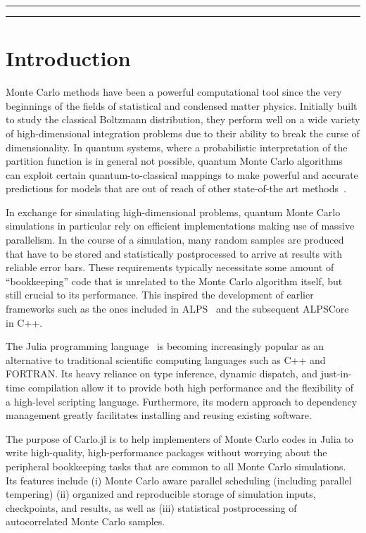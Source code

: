 \documentclass{SciPost}
\begin{document}
\vspace{10pt}
\noindent\rule{\textwidth}{1pt}
\tableofcontents
\noindent\rule{\textwidth}{1pt}
\vspace{10pt}

\section{Introduction}
\label{sec:intro}
Monte Carlo methods have been a powerful computational tool since the very beginnings of the fields of statistical and condensed matter physics\cite{Metropolis1953}. Initially built to study the classical Boltzmann distribution, they perform well on a wide variety of high-dimensional integration problems due to their ability to break the curse of dimensionality. In quantum systems, where a probabilistic interpretation of the partition function is in general not possible, quantum Monte Carlo algorithms can exploit certain quantum-to-classical mappings to make powerful and accurate predictions for models that are out of reach of other state-of-the art methods~\cite{Gubernatis2016}. 

In exchange for simulating high-dimensional problems, quantum Monte Carlo simulations in particular rely on efficient implementations making use of massive parallelism. In the course of a simulation, many random samples are produced that have to be stored and statistically postprocessed to arrive at results with reliable error bars. These requirements typically necessitate some amount of ``bookkeeping'' code that is unrelated to the Monte Carlo algorithm itself, but still crucial to its performance. This inspired the development of earlier frameworks such as the ones included in ALPS~\cite{ALPS} and the subsequent ALPSCore~\cite{ALPSCore} in C++.

The Julia programming language~\cite{Bezanson2012} is becoming increasingly popular as an alternative to traditional scientific computing languages such as C++ and FORTRAN. Its heavy reliance on type inference, dynamic dispatch, and just-in-time compilation allow it to provide both high performance and the flexibility of a high-level scripting language. Furthermore, its modern approach to dependency management greatly facilitates installing and reusing existing software.

The purpose of Carlo.jl is to help implementers of Monte Carlo codes in Julia to write high-quality, high-performance packages without worrying about the peripheral bookkeeping tasks that are common to all Monte Carlo simulations. Its features include (i) Monte Carlo aware parallel scheduling (including parallel tempering) (ii) organized and reproducible storage of simulation inputs, checkpoints, and results, as well as (iii) statistical postprocessing of autocorrelated Monte Carlo samples.
\end{document}
